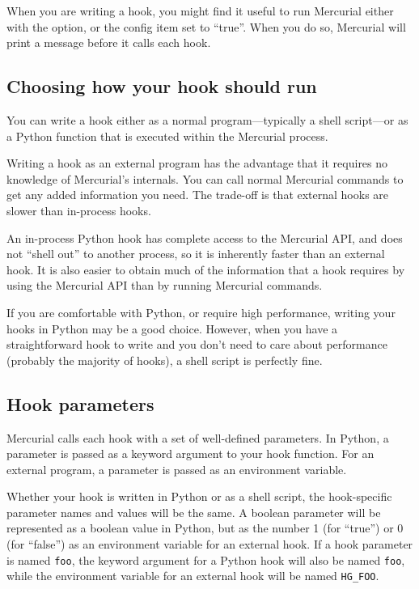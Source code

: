 When you are writing a hook, you might find it useful to run Mercurial
either with the  option, or the  config
item set to ``true''.  When you do so, Mercurial will print a message
before it calls each hook.

\subsection{Choosing how your hook should run}
\label{sec:hook:lang}

You can write a hook either as a normal program---typically a shell
script---or as a Python function that is executed within the Mercurial
process.

Writing a hook as an external program has the advantage that it
requires no knowledge of Mercurial's internals.  You can call normal
Mercurial commands to get any added information you need.  The
trade-off is that external hooks are slower than in-process hooks.

An in-process Python hook has complete access to the Mercurial API,
and does not ``shell out'' to another process, so it is inherently
faster than an external hook.  It is also easier to obtain much of the
information that a hook requires by using the Mercurial API than by
running Mercurial commands.

If you are comfortable with Python, or require high performance,
writing your hooks in Python may be a good choice.  However, when you
have a straightforward hook to write and you don't need to care about
performance (probably the majority of hooks), a shell script is
perfectly fine.

\subsection{Hook parameters}
\label{sec:hook:param}

Mercurial calls each hook with a set of well-defined parameters.  In
Python, a parameter is passed as a keyword argument to your hook
function.  For an external program, a parameter is passed as an
environment variable.

Whether your hook is written in Python or as a shell script, the
hook-specific parameter names and values will be the same.  A boolean
parameter will be represented as a boolean value in Python, but as the
number 1 (for ``true'') or 0 (for ``false'') as an environment
variable for an external hook.  If a hook parameter is named
\texttt{foo}, the keyword argument for a Python hook will also be
named \texttt{foo}, while the environment variable for an external
hook will be named \texttt{HG\_FOO}.

